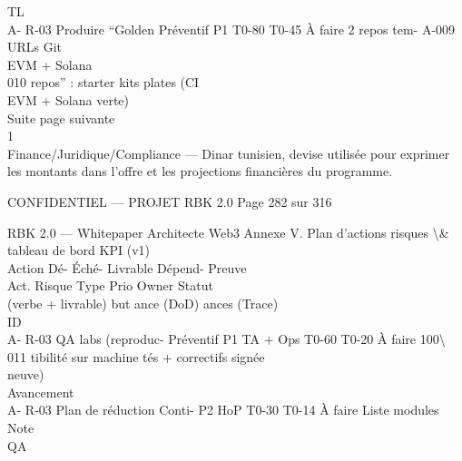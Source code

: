 TL\\
A- R-03     Produire “Golden Préventif P1                 T0-80 T0-45 À faire    2 repos tem-   A-009      URLs Git\\
EVM + Solana\\
010         repos” : starter kits                                                plates (CI\\
EVM + Solana                                                         verte)\\
Suite page suivante\\
\vspace{0.5em}
1\\
Finance/Juridique/Compliance — Dinar tunisien, devise utilisée pour exprimer les montants dans l’offre et les projections financières du programme.\\
\vspace{0.5em}
\vspace{0.5em}
\begin{confidential}CONFIDENTIEL — PROJET RBK 2.0                                                 Page 282 sur 316\end{confidential}
RBK 2.0 — Whitepaper Architecte Web3                                                                         Annexe V. Plan d’actions risques \textbackslash{}& tableau de bord KPI (v1)\\
\vspace{0.5em}
\vspace{0.5em}
Action                                            Dé-   Éché-           Livrable        Dépend- Preuve\\
Act. Risque                      Type    Prio Owner                       Statut\\
(verbe + livrable)                                but   ance            (DoD)           ances   (Trace)\\
ID\\
A- R-03     QA labs (reproduc- Préventif P1   TA + Ops        T0-60 T0-20 À faire   100\textbackslash{}%
011         tibilité sur machine                                                    tés + correctifs           signée\\
neuve)\\
Avancement\\
A- R-03     Plan de réduction Conti-        P2   HoP          T0-30 T0-14 À faire   Liste modules         Note\\
QA\\
